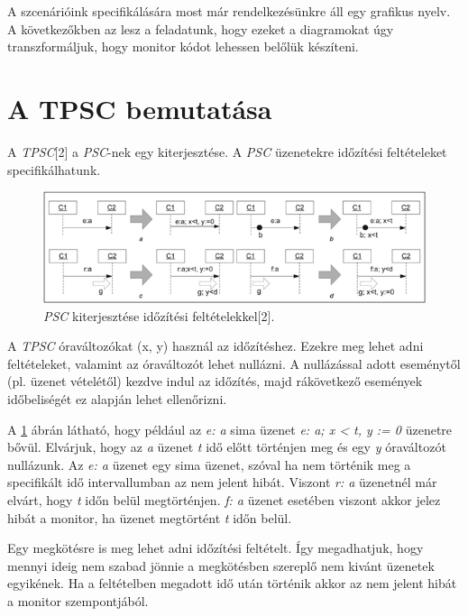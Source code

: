 A szcenárióink specifikálására most már rendelkezésünkre áll egy grafikus nyelv.
A következőkben az lesz a feladatunk, hogy ezeket a diagramokat úgy transzformáljuk, hogy monitor kódot lehessen belőlük készíteni.

\clearpage\section{A TPSC bemutatása}
A \textit{TPSC}[2] a \textit{PSC}-nek egy kiterjesztése.
A \textit{PSC} üzenetekre időzítési feltételeket specifikálhatunk.

\begin{figure}[!ht]
    \centering
    \includegraphics[width=150mm, keepaspectratio]{figures/4abra.png}
    \caption{\textit{PSC} kiterjesztése időzítési feltételekkel[2].}
    \label{psc_clock_improvement}
\end{figure}

A \textit{TPSC} óraváltozókat (x, y) használ az időzítéshez.
Ezekre meg lehet adni feltételeket, valamint az óraváltozót lehet nullázni.
A nullázással adott eseménytől (pl. üzenet vételétől) kezdve indul az időzítés, majd rákövetkező események időbeliségét ez alapján lehet ellenőrizni.

A \ref{psc_clock_improvement} ábrán látható, hogy például az \textit{e: a} sima üzenet \textit{e: a; x < t, y := 0} üzenetre bővül.
Elvárjuk, hogy az \textit{a} üzenet \textit{t} idő előtt történjen meg és egy \textit{y} óraváltozót nullázunk.
Az \textit{e: a} üzenet egy sima üzenet, szóval ha nem történik meg a specifikált idő intervallumban az nem jelent hibát.
Viszont \textit{r: a} üzenetnél már elvárt, hogy \textit{t} időn belül megtörténjen. \textit{f: a} üzenet esetében viszont akkor jelez hibát a monitor, ha üzenet megtörtént \textit{t} időn belül.

Egy megkötésre is meg lehet adni időzítési feltételt.
Így megadhatjuk, hogy mennyi ideig nem szabad jönnie a megkötésben szereplő nem kivánt üzenetek egyikének.
Ha a feltételben megadott idő után történik akkor az nem jelent hibát a monitor szempontjából.

